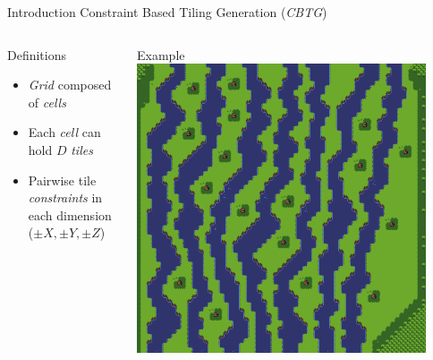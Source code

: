 \documentclass{beamer}
\begin{document}
  \begin{frame}[fragile]{Introduction}
    Constraint Based Tiling Generation (\textit{CBTG})
    \begin{columns}[T,onlytextwidth]
        \begin{block}{Definitions}
          \begin{itemize}
            \item \textit{Grid} composed of \textit{cells}
            \item Each \textit{cell} can hold $D$ \textit{tiles}
            \item Pairwise tile \textit{constraints} in each dimension ($\pm X, \pm Y, \pm Z$)
          \end{itemize}
        \end{block}
        \begin{block}{Example}
          \includegraphics[width=0.9\textwidth]{img/forestmicro_64x64.pdf}
        \end{block}
    \end{columns}
  \end{frame}
\end{document}

